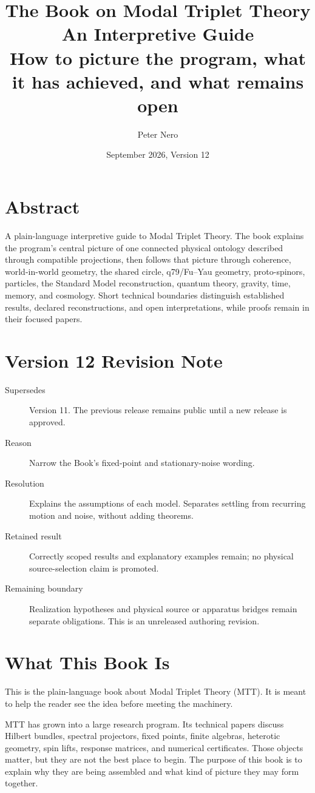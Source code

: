 \documentclass[11pt,openany]{book}
\title{\Huge The Book on Modal Triplet Theory\\[2mm]
\Large An Interpretive Guide\\[4mm]
\large How to picture the program, what it has achieved, and what remains open}
\author{Peter Nero}
\date{September 2026, Version 12}
\newenvironment{abstract}
  {\chapter*{Abstract}\addcontentsline{toc}{chapter}{Abstract}\noindent}
  {\par}
\begin{document}
\frontmatter
\maketitle

\begin{abstract}
A plain-language interpretive guide to Modal Triplet Theory. The book
explains the program's central picture of one connected physical ontology
described through compatible projections, then follows that picture through
coherence, world-in-world geometry, the shared circle, q79/Fu--Yau geometry,
proto-spinors, particles, the Standard Model reconstruction, quantum theory,
gravity, time, memory, and cosmology. Short technical boundaries distinguish
established results, declared reconstructions, and open interpretations,
while proofs remain in their focused papers.
\end{abstract}

\chapter*{Version 12 Revision Note}
\begin{description}
\item[Supersedes] Version 11. The previous release remains public until a new release is approved.
\item[Reason] Narrow the Book's fixed-point and stationary-noise wording.
\item[Resolution] Explains the assumptions of each model. Separates settling
from recurring motion and noise, without adding theorems.
\item[Retained result] Correctly scoped results and explanatory examples remain; no physical source-selection claim is promoted.
\item[Remaining boundary] Realization hypotheses and physical source or apparatus bridges remain separate obligations. This is an unreleased authoring revision.
\end{description}

\chapter*{What This Book Is}

This is the plain-language book about Modal Triplet Theory (MTT). It is meant
to help the reader see the idea before meeting the machinery.

MTT has grown into a large research program. Its technical papers discuss
Hilbert bundles, spectral projectors, fixed points, finite algebras,
heterotic geometry, spin lifts, response matrices, and numerical
certificates. Those objects matter, but they are not the best place to begin.
The purpose of this book is to explain why they are being assembled and what
kind of picture they may form together.
\end{document}
